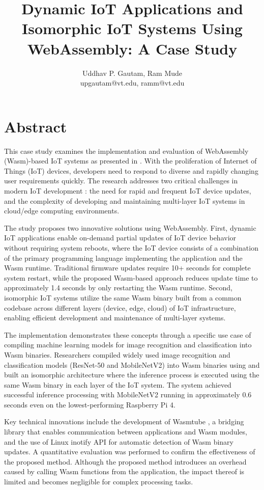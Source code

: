 \documentclass[11pt]{article}
\title{Dynamic IoT Applications and Isomorphic IoT Systems Using WebAssembly: A Case Study}
\author{Uddhav P. Gautam, Ram Mude\\
\small upgautam@vt.edu, ramm@vt.edu}
\date{}
\begin{document}
\maketitle

\singlespacing

\section*{Abstract}

This case study examines the implementation and evaluation of WebAssembly (Wasm)-based IoT systems as presented in \cite{10539584}. With the proliferation of Internet of Things (IoT) devices, developers need to respond to diverse and rapidly changing user requirements quickly. The research addresses two critical challenges in modern IoT development \cite{article}: the need for rapid and frequent IoT device updates, and the complexity of developing and maintaining multi-layer IoT systems in cloud/edge computing environments.

The study proposes two innovative solutions using WebAssembly. First, dynamic IoT applications enable on-demand partial updates of IoT device behavior without requiring system reboots, where the IoT device consists of a combination of the primary programming language implementing the application and the Wasm runtime. Traditional firmware updates require 10+ seconds for complete system restart, while the proposed Wasm-based approach reduces update time to approximately 1.4 seconds by only restarting the Wasm runtime. Second, isomorphic IoT systems utilize the same Wasm binary built from a common codebase across different layers (device, edge, cloud) of IoT infrastructure, enabling efficient development and maintenance of multi-layer systems.

The implementation demonstrates these concepts through a specific use case of compiling machine learning models for image recognition and classification into Wasm binaries. Researchers compiled widely used image recognition and classification models (ResNet-50 and MobileNetV2) into Wasm binaries using \cite{apachetvm2023} and built an isomorphic architecture where the inference process is executed using the same Wasm binary in each layer of the IoT system. The system achieved successful inference processing with MobileNetV2 running in approximately 0.6 seconds even on the lowest-performing Raspberry Pi 4.

Key technical innovations include the development of Wasmtube \cite{wasmtube2023}, a bridging library that enables communication between \cite{nerves2023} applications and Wasm modules, and the use of Linux inotify API for automatic detection of Wasm binary updates. A quantitative evaluation was performed to confirm the effectiveness of the proposed method. Although the proposed method introduces an overhead caused by calling Wasm functions from the application, the impact thereof is limited and becomes negligible for complex processing tasks.
\end{document}
